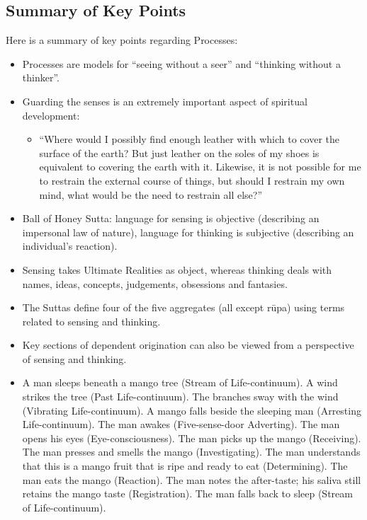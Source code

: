 \subsection*{Summary of Key Points}

Here is a summary of key points regarding Processes:

\begin{itemize}

\item Processes are models for “seeing without a seer” and “thinking without a thinker”.

\item Guarding the senses is an extremely important aspect of spiritual development:

\begin{itemize}

\item “Where would I possibly find enough leather with which to cover the surface of the earth? But just leather on the soles of my shoes is equivalent to covering the earth with it. Likewise, it is not possible for me to restrain the external course of things, but should I restrain my own mind, what would be the need to restrain all else?”

\end{itemize}

\item Ball of Honey Sutta: language for sensing is objective (describing an impersonal law of nature), language for thinking is subjective (describing an individual’s reaction).

\item Sensing takes Ultimate Realities as object, whereas thinking deals with names, ideas, concepts, judgements, obsessions and fantasies.

\item The Suttas define four of the five aggregates (all except rūpa) using terms related to sensing and thinking.

\item Key sections of dependent origination can also be viewed from a perspective of sensing and thinking.

\item A man sleeps beneath a mango tree (Stream of Life-continuum). A wind strikes the tree (Past Life-continuum). The branches sway with the wind (Vibrating Life-continuum). A mango falls beside the sleeping man (Arresting Life-continuum). The man awakes (Five-sense-door Adverting). The man opens his eyes (Eye-consciousness). The man picks up the mango (Receiving). The man presses and smells the mango (Investigating). The man understands that this is a mango fruit that is ripe and ready to eat (Determining). The man eats the mango (Reaction). The man notes the after-taste; his saliva still retains the mango taste (Registration). The man falls back to sleep (Stream of Life-continuum).


\end{itemize}
